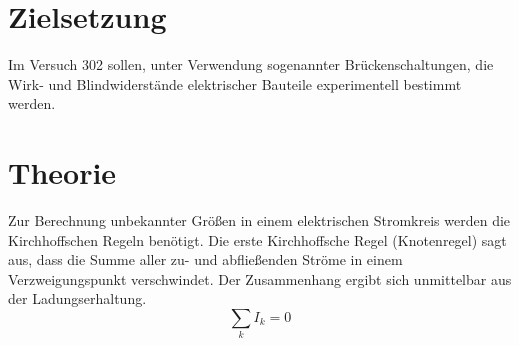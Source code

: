 \setcounter{page}{1} 
\section*{Zielsetzung}
Im Versuch 302 sollen, unter Verwendung sogenannter Brückenschaltungen, die Wirk- und Blindwiderstände
 elektrischer Bauteile experimentell bestimmt werden.
\section{Theorie}
Zur Berechnung unbekannter Größen in einem elektrischen Stromkreis werden die Kirchhoffschen Regeln
benötigt. Die erste Kirchhoffsche Regel (Knotenregel) sagt aus, dass die Summe aller zu- und abfließenden
Ströme in einem Verzweigungspunkt verschwindet. Der Zusammenhang ergibt sich unmittelbar aus der Ladungserhaltung.
\begin{equation}
  \sum_k I_k = 0
  \label{eq: knoten}
\end{equation}

